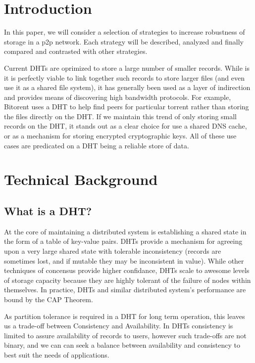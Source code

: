 \documentclass[conference]{IEEEtran}
\begin{document}
\section{Introduction}

In this paper, we will consider a selection of strategies to increase robustness of storage in a p2p network.
Each strategy will be described, analyzed and finally compared and contrasted with other strategies.


Current DHTs are oprimized to store a large number of smaller records.
While is it is perfectly viable to link together such records to store larger files (and even use it as a shared file system), it has generally been used as a layer of indirection and provides means of discovering high bandwidth protocols. For example, Bitorent uses a DHT to help find peers for particular torrent rather than storing the files directly on the DHT.
If we maintain this trend of only storing small records on the DHT, it stands out as a clear choice for use a shared DNS cache, or as a mechanism for storing encrypted cryptographic keys.
All of these  use cases are predicated on a DHT being a reliable store of data.

\section{Technical Background}
\subsection{What is a DHT?}
At the core of maintaining a distributed system is establishing a shared state in the form of a table of key-value pairs.
DHTs provide a mechanism for agreeing upon a very large shared state with tolerable inconsistency (records are sometimes lost, and if mutable they may be inconsistent in value).
While other techniques of concensus provide higher confidance, DHTs scale to awesome levels of storage capacity because they are highly tolerant of the failure of nodes within themselves.
In practice, DHTs and similar distributed system's performance are bound by the CAP Theorem\cite{brewer2010certain}.

As partition tolerance is required in a DHT for long term operation, this leaves us a trade-off between Consistency and Availability.
In DHTs consistency is limited to assure availability of records to users, however such trade-offs are not binary, and we can can seek a balance between availability and consistency to best suit the needs of applications.
\end{document}

